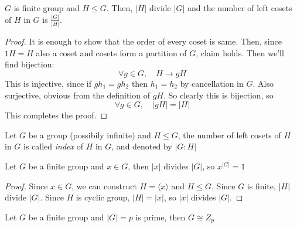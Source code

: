\documentclass[12pt, a4paper, openany, twoside]{book}
\theoremstyle{definition}
\theoremstyle{remark}
\theoremstyle{plain}
\numberwithin{equation}{section}
\begin{document}
\begin{tcolorbox}[colback=yellow!10!white,colframe=blue!75!black,title=Lagrange's Theorem]

$G$ is finite group and $H \leq G$. Then, $|H|$ divide $|G|$ and the number of left cosets of $H$ in $G$ is $\frac{|G|}{|H|}$.

\end{tcolorbox}

\begin{proof}
    
It is enough to show that the order of every coset is same. Then, since $1H = H$ also a coset and cosets form a partition of $G$, 
claim holds. Then we'll find bijection: 
\[\forall g \in G, \quad H \rightarrow gH\]
This is injective, since if $gh_1 = gh_2$ then $h_1 = h_2$ by cancellation in $G$. 
Also surjective, obvious from the definition of $gH$. So clearly this is bijection, so 
\[\forall g \in G, \quad |gH| = |H|\]
This completes the proof.

\end{proof}

\begin{tcolorbox}[colback=yellow!10!white,colframe=brown!75!black,title=Index]

Let $G$ be a group (possibily infinite) and $H \leq G$, the number of left cosets of $H$ in $G$ 
is called \textit{index} of $H$ in $G$, and denoted by $|G:H|$

\end{tcolorbox}

\begin{tcolorbox}[colback=yellow!10!white,colframe=green!75!black,title=Corollary 9]

Let $G$ be a finite group and $x \in G$, then $|x|$ divides $|G|$, so $x^{|G|} = 1$

\end{tcolorbox}

\begin{proof}
    
Since $x \in G$, we can construct $H = \langle x \rangle$ and $H \leq G$. Since $G$ is finite, 
$|H|$ divide $|G|$. Since $H$ is cyclic group, $|H| = |x|$, so $|x|$ divides $|G|$. 

\end{proof}

\begin{tcolorbox}[colback=yellow!10!white,colframe=green!75!black,title=Corollary 10]

    Let $G$ be a finite group and $|G| = p$ is prime, then $G \cong Z_p$
    
\end{tcolorbox}
\end{document}
